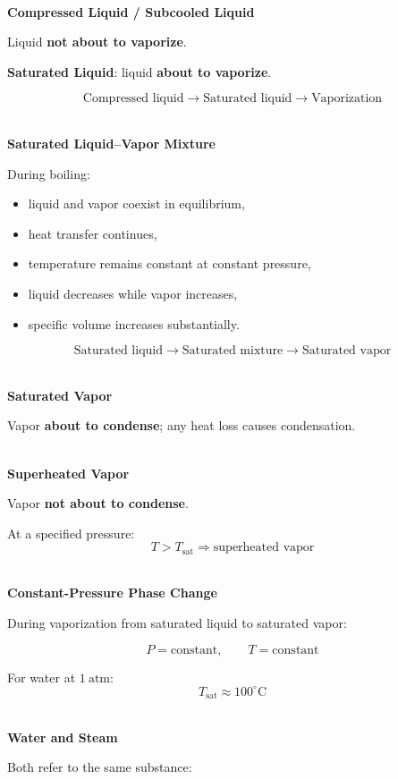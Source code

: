 \documentclass[12pt]{article}
\begin{document}
\textbf{\\ Compressed Liquid / Subcooled Liquid}

Liquid \textbf{not about to vaporize}.

\textbf{Saturated Liquid}: liquid \textbf{about to vaporize}.

\[
\boxed{
\text{Compressed liquid}
\rightarrow
\text{Saturated liquid}
\rightarrow
\text{Vaporization}
}
\]

\textbf{\\ Saturated Liquid--Vapor Mixture}

During boiling:
\begin{itemize}[leftmargin=*]
    \item liquid and vapor coexist in equilibrium,
    \item heat transfer continues,
    \item temperature remains constant at constant pressure,
    \item liquid decreases while vapor increases,
    \item specific volume increases substantially.
\end{itemize}

\[
\boxed{
\text{Saturated liquid}
\rightarrow
\text{Saturated mixture}
\rightarrow
\text{Saturated vapor}
}
\]

\textbf{\\ Saturated Vapor}

Vapor \textbf{about to condense}; any heat loss causes condensation.

\textbf{\\ Superheated Vapor}

Vapor \textbf{not about to condense}.

At a specified pressure:
\[
\boxed{T>T_{\mathrm{sat}}\Rightarrow\text{superheated vapor}}
\]

\textbf{\\ Constant-Pressure Phase Change}

During vaporization from saturated liquid to saturated vapor:

\begin{equation*}
\boxed{P=\text{constant},\qquad T=\text{constant}}
\end{equation*}

For water at $1~\mathrm{atm}$:
\[
\boxed{T_{\mathrm{sat}}\approx100^\circ\mathrm{C}}
\]

\textbf{\\ Water and Steam}

Both refer to the same substance:
\end{document}
